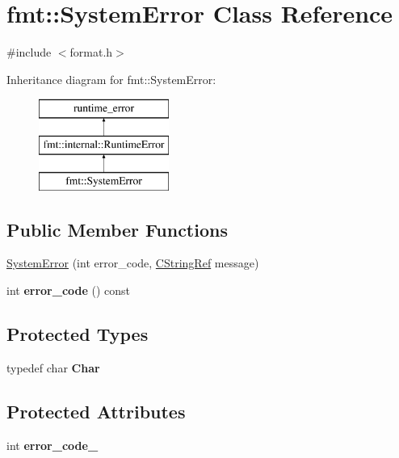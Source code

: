 \hypertarget{classfmt_1_1SystemError}{}\section{fmt\+:\+:System\+Error Class Reference}
\label{classfmt_1_1SystemError}


{\ttfamily \#include $<$format.\+h$>$}

Inheritance diagram for fmt\+:\+:System\+Error\+:\begin{figure}[H]
\begin{center}
\leavevmode
\includegraphics[height=3.000000cm]{classfmt_1_1SystemError}
\end{center}
\end{figure}
\subsection*{Public Member Functions}
\begin{DoxyCompactItemize}
\item 
\hyperlink{classfmt_1_1SystemError_a307c40b2542f53d7426b09319255d35c}{System\+Error} (int error\+\_\+code, \hyperlink{classfmt_1_1BasicCStringRef}{C\+String\+Ref} message)
\item 
int {\bfseries error\+\_\+code} () const \hypertarget{classfmt_1_1SystemError_ae6a1e8889412ce7818d4ba22cdb511d7}{}\label{classfmt_1_1SystemError_ae6a1e8889412ce7818d4ba22cdb511d7}

\end{DoxyCompactItemize}
\subsection*{Protected Types}
\begin{DoxyCompactItemize}
\item 
typedef char {\bfseries Char}\hypertarget{classfmt_1_1SystemError_a5b10a8e6d426d0d8768944622a52ae51}{}\label{classfmt_1_1SystemError_a5b10a8e6d426d0d8768944622a52ae51}

\end{DoxyCompactItemize}
\subsection*{Protected Attributes}
\begin{DoxyCompactItemize}
\item 
int {\bfseries error\+\_\+code\+\_\+}\hypertarget{classfmt_1_1SystemError_a705a49ba6ef5e06dced3b845bdc7330a}{}\label{classfmt_1_1SystemError_a705a49ba6ef5e06dced3b845bdc7330a}

\end{DoxyCompactItemize}


